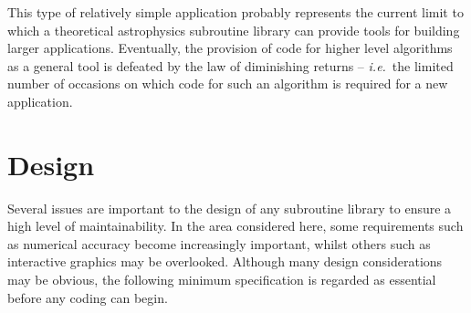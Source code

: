 \begin {description}
This type of relatively simple application probably represents the current
limit to which a theoretical astrophysics subroutine library can provide
tools for building larger applications.
Eventually, the provision of code for higher level algorithms as a general
tool is defeated by the law of diminishing returns -- {\em i.e.}\ the
limited number of occasions on which code for such an algorithm is required
for a new application.
\end {description}

\section {Design}
Several issues are important to the design of any subroutine library to
ensure a high level of maintainability.
In the area considered here, some requirements such as numerical accuracy
become increasingly important, whilst others such as interactive
graphics may be overlooked.
Although many design considerations may be obvious, the following minimum
specification is regarded as essential before any coding can begin.

